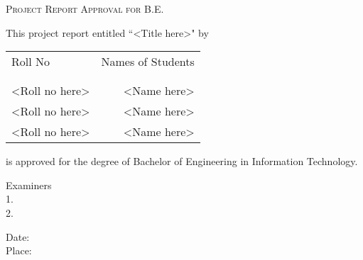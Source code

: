 \newpage
\thispagestyle{empty}

\begin{center}
    \Large \textsc {Project Report Approval for B.E.}\\[0.5cm]
\end{center}

\normalsize This project report entitled ``<Title here>" by\\
\begin{table}[h]
    \centering
    \begin{tabular}{lr}
        Roll No        & Names of Students \\ \\ \hline
        \\
        <Roll no here> & <Name here>       \\
        <Roll no here> & <Name here>       \\
        <Roll no here> & <Name here>       \\
    \end{tabular}
\end{table}
\normalsize is approved for the degree of Bachelor of Engineering in Information Technology.
\vspace{.4in}

\begin{flushright}
    Examiners \\[0.5cm]
    1. \underline{\hspace{3cm}}\\[0.5cm]
    2. \underline{\hspace{3cm}}\\[0.5cm]
\end{flushright}

\begin{flushleft}
    Date:\\[0.5cm]
    Place:\\[0.5cm]
\end{flushleft}
